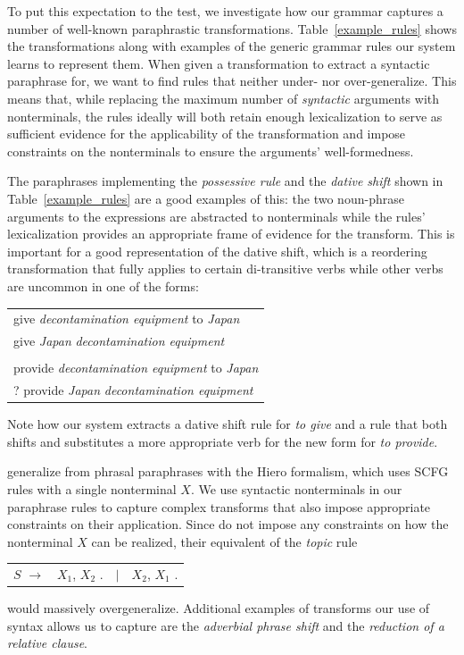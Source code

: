 \documentclass[11pt]{article}
\begin{document}
To put this expectation to the test, we investigate how our grammar
captures a number of well-known paraphrastic
transformations. Table~\ref{example_rules} shows the transformations
along with examples of the generic grammar rules our system learns to
represent them. When given a transformation to extract a syntactic
paraphrase for, we want to find rules that neither under- nor
over-generalize. This means that, while replacing the maximum number
of \emph{syntactic} arguments with nonterminals, the rules ideally
will both retain enough lexicalization to serve as sufficient evidence
for the applicability of the transformation and impose constraints on
the nonterminals to ensure the arguments' well-formedness.

The paraphrases implementing the \emph{possessive rule} and the
\emph{dative shift} shown in Table~\ref{example_rules} are a good
examples of this: the two noun-phrase arguments to the expressions are
abstracted to nonterminals while the rules' lexicalization provides an
appropriate frame of evidence for the transform. This is important for
a good representation of the dative shift, which is a reordering
transformation that fully applies to certain di-transitive verbs while
other verbs are uncommon in one of the forms:
\begin{center}
\begin{tabular}{l}
  give \emph{decontamination equipment} to \emph{Japan} \\
  give \emph{Japan} \emph{decontamination equipment} \\
  \vspace{-10pt}\\
  provide \emph{decontamination equipment} to \emph{Japan} \\
  ? provide \emph{Japan} \emph{decontamination equipment} \\
\end{tabular}
\end{center}
Note how our system extracts a dative shift rule for \emph{to give}
and a rule that both shifts and substitutes a more appropriate verb
for the new form for \emph{to provide}.

 generalize from phrasal paraphrases with the
Hiero formalism, which uses SCFG rules with a single nonterminal
$X$. We use syntactic nonterminals in our paraphrase rules to capture
complex transforms that also impose appropriate constraints on their
application. Since  do not impose any constraints
on how the nonterminal $X$ can be realized, their equivalent of the
\emph{topic} rule
\begin{center}
\begin{tabular}{rrcl}
  $\mathit{S}$ $\rightarrow$ & $\mathit{X}_1$,
  $\mathit{X}_2$ . & $\mid$ & $\mathit{X}_2$, $\mathit{X}_1$ . \\
\end{tabular}
\end{center}
would massively overgeneralize. Additional examples of transforms our
use of syntax allows us to capture are the \emph{adverbial phrase 
 shift} and the \emph{reduction of a relative clause}.
 
\end{document}
